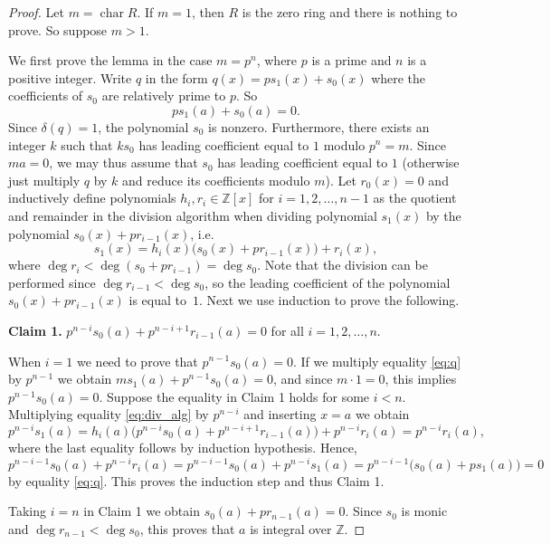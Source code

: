 \documentclass[12pt,a4paper]{amsart}
\theoremstyle{definition}
\newcommand{\Z}{\mathbb{Z}}
\DeclareMathOperator{\ch}{char}
\begin{document}
\begin{proof}
    Let $m = \ch R$. If $m=1$, then $R$ is the zero ring and there is nothing to prove.
    So suppose $m >1$.
    
    We first prove the lemma in the case $m=p^n$, where $p$ is a prime and $n$ is a positive integer. 
    Write $q$ in the form $q(x)=p s_1(x)+s_0(x)$ where the coefficients of $s_0$ are relatively prime to $p$. So
    \begin{equation}\label{eq:q}
        p s_1(a)+s_0(a)=0.
    \end{equation}
    Since $\delta(q)=1$, the polynomial $s_0$ is nonzero.
    Furthermore, there exists an integer $k$ such that $ks_0$ has leading coefficient equal to $1$ modulo $p^n=m$.
    Since $ma=0$, we may thus assume that $s_0$ has leading coefficient equal to $1$ (otherwise just multiply $q$ by $k$ and reduce its coefficients modulo $m$).
    Let $r_0(x)=0$ and inductively define polynomials $h_i,r_i \in \Z[x]$ for $i=1,2,\ldots,n-1$ as the quotient and remainder in the division algorithm when dividing polynomial $s_1(x)$ by the polynomial $s_0(x)+pr_{i-1}(x)$, i.e.
    \begin{equation}\label{eq:div_alg}
    s_1(x)=h_i(x)\big(s_0(x)+pr_{i-1}(x)\big)+r_i(x),
    \end{equation}
    where $\deg r_i< \deg (s_0 + pr_{i-1}) = \deg s_0$.
    Note that the division can be performed since $\deg r_{i-1} < \deg s_0$, so the leading coefficient of the polynomial $s_0(x)+pr_{i-1}(x)$ is equal to~$1$.
    Next we use induction to prove the following.
    
    \medskip
    {\bf Claim 1.} $p^{n-i}s_0(a)+p^{n-i+1}r_{i-1}(a)=0$ for all $i=1,2,\ldots,n$.
    
    \medskip
    When $i=1$ we need to prove that $p^{n-1}s_0(a)=0$. If we multiply equality \eqref{eq:q} by $p^{n-1}$ we obtain $m s_1(a)+p^{n-1}s_0(a)=0$, and since $m \cdot 1=0$, this implies $p^{n-1}s_0(a)=0$.
    Suppose the equality in Claim 1 holds for some $i < n$.
    Multiplying equality \eqref{eq:div_alg} by $p^{n-i}$ and inserting $x=a$ we obtain
    $$p^{n-i}s_1(a)=h_i(a)\big(p^{n-i}s_0(a)+p^{n-i+1}r_{i-1}(a)\big)+p^{n-i}r_i(a)=p^{n-i}r_i(a),$$
    where the last equality follows by induction hypothesis.
    Hence,
    $$p^{n-i-1}s_0(a)+p^{n-i}r_i(a)=p^{n-i-1}s_0(a)+p^{n-i}s_1(a)=p^{n-i-1}\big(s_0(a)+ps_1(a)\big)=0$$
    by equality \eqref{eq:q}. This proves the induction step and thus Claim 1.

    \medskip
    Taking $i=n$ in Claim 1 we obtain $s_0(a)+pr_{n-1}(a)=0$. Since $s_0$ is monic and $\deg r_{n-1}<\deg s_0$, this proves that $a$ is integral over $\Z$.


\end{proof}
\end{document}
